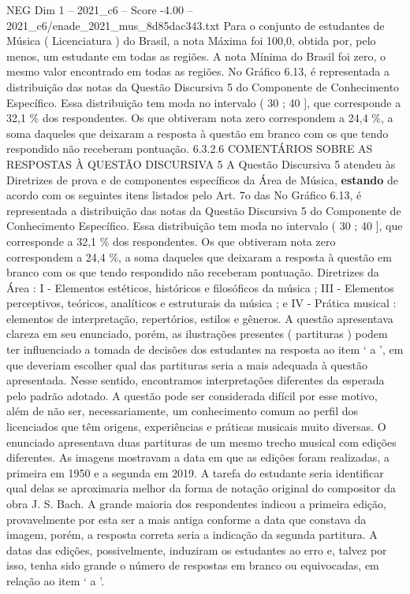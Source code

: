 \begin{textsample}{NEG Dim 1 – 2021\_c6 – Score -4.00 – 2021\_c6/enade\_2021\_mus\_8d85dac343.txt}
Para o conjunto de estudantes de Música ( Licenciatura ) do Brasil, a nota Máxima foi 100,0, obtida por, pelo menos, um estudante em todas as regiões.
A nota Mínima do Brasil foi zero, o mesmo valor encontrado em todas as regiões.
No Gráfico 6.13, é representada a distribuição das notas da Questão Discursiva 5 do Componente de Conhecimento Específico.
Essa distribuição tem moda no intervalo ( 30 ; 40 ], que corresponde a 32,1 \% dos respondentes.
Os que obtiveram nota zero correspondem a 24,4 \%, a soma daqueles que deixaram a resposta à questão em branco com os que tendo respondido não receberam pontuação. 6.3.2.6 COMENTÁRIOS SOBRE AS RESPOSTAS À QUESTÃO DISCURSIVA 5 A Questão Discursiva 5 atendeu às Diretrizes de prova e de componentes específicos da Área de Música, \textbf{estando} de acordo com os seguintes itens listados pelo Art. 7o das No Gráfico 6.13, é representada a distribuição das notas da Questão Discursiva 5 do Componente de Conhecimento Específico.
Essa distribuição tem moda no intervalo ( 30 ; 40 ], que corresponde a 32,1 \% dos respondentes.
Os que obtiveram nota zero correspondem a 24,4 \%, a soma daqueles que deixaram a resposta à questão em branco com os que tendo respondido não receberam pontuação.
Diretrizes da Área : I - Elementos estéticos, históricos e filosóficos da música ; III - Elementos perceptivos, teóricos, analíticos e estruturais da música ; e IV - Prática musical : elementos de interpretação, repertórios, estilos e gêneros.
A questão apresentava clareza em seu enunciado, porém, as ilustrações presentes ( partituras ) podem ter influenciado a tomada de decisões dos estudantes na resposta ao item ‘ a ’, em que deveriam escolher qual das partituras seria a mais adequada à questão apresentada.
Nesse sentido, encontramos interpretações diferentes da esperada pelo padrão adotado.
A questão pode ser considerada difícil por esse motivo, além de não ser, necessariamente, um conhecimento comum ao perfil dos licenciados que têm origens, experiências e práticas musicais muito diversas.
O enunciado apresentava duas partituras de um mesmo trecho musical com edições diferentes.
As imagens mostravam a data em que as edições foram realizadas, a primeira em 1950 e a segunda em 2019.
A tarefa do estudante seria identificar qual delas se aproximaria melhor da forma de notação original do compositor da obra J.
S.
Bach.
A grande maioria dos respondentes indicou a primeira edição, provavelmente por esta ser a mais antiga conforme a data que constava da imagem, porém, a resposta correta seria a indicação da segunda partitura.
A datas das edições, possivelmente, induziram os estudantes ao erro e, talvez por isso, tenha sido grande o número de respostas em branco ou equivocadas, em relação ao item ‘ a ’.

\end{textsample}
